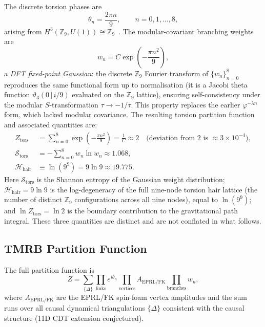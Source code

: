 \documentclass[11pt,a4paper]{article}
\begin{document}
The discrete torsion phases are
\begin{equation}
  \theta_n = \frac{2\pi n}{9}, \qquad n = 0,1,\ldots,8,
  \label{eq:torsion_phases}
\end{equation}
arising from $H^3(\mathbb{Z}_9, U(1)) \cong \mathbb{Z}_9$~\cite{Vafa1986,AspinwallMorrison1995}.  The modular-covariant
branching weights are
\begin{equation}
  w_n = C\exp\!\left(-\frac{\pi n^2}{9}\right),
  \label{eq:wn}
\end{equation}
a \emph{DFT fixed-point Gaussian}: the discrete $\mathbb{Z}_9$ Fourier transform
of $\{w_n\}_{n=0}^{8}$ reproduces the same functional form up to normalisation
(it is a Jacobi theta function $\vartheta_3(0\,|\,i/9)$ evaluated on the
$\mathbb{Z}_9$ lattice), ensuring self-consistency under the modular
$S$-transformation $\tau\to-1/\tau$.  This property replaces the earlier
$\varphi^{-\lambda n}$ form, which lacked modular covariance.
The resulting torsion partition function and associated quantities are:
\begin{align}
  Z_{\mathrm{tors}} &= \sum_{n=0}^{8} \exp\!\left(-\frac{\pi n^2}{9}\right) = \frac{1}{C} \approx 2
    \quad \bigl(\text{deviation from 2 is }{\approx}3\times10^{-4}\bigr),
  \label{eq:Z_tors_val}\\
  \mathcal{S}_{\mathrm{tors}} &= -\sum_{n=0}^{8} w_n \ln w_n \approx 1.068,
  \label{eq:torsion_entropy}\\
  \mathcal{H}_{\mathrm{hair}} &\equiv \ln(9^9) = 9\ln 9 \approx 19.775.
  \label{eq:H_hair}
\end{align}
Here $\mathcal{S}_{\mathrm{tors}}$ is the Shannon entropy of the Gaussian weight
distribution; $\mathcal{H}_{\mathrm{hair}} = 9\ln 9$ is the log-degeneracy of
the full nine-node torsion hair lattice (the number of distinct $\mathbb{Z}_9$
configurations across all nine nodes), equal to $\ln(9^9)$; and
$\ln Z_{\mathrm{tors}} = \ln 2$ is the boundary contribution to the gravitational
path integral.  These three quantities are distinct and are not conflated in what
follows.

\subsection{TMRB Partition Function}

The full partition function is
\begin{equation}
  Z = \sum_{\{\Delta\}} \prod_{\mathrm{links}} e^{i\theta_n}
      \prod_{\mathrm{vertices}} A_{\mathrm{EPRL/FK}}
      \prod_{\mathrm{branches}} w_n,
  \label{eq:Z}
\end{equation}
where $A_{\mathrm{EPRL/FK}}$ are the EPRL/FK spin-foam vertex amplitudes and the
sum runs over all causal dynamical triangulations $\{\Delta\}$ consistent with the
causal structure (11D CDT extension conjectured).
\end{document}
